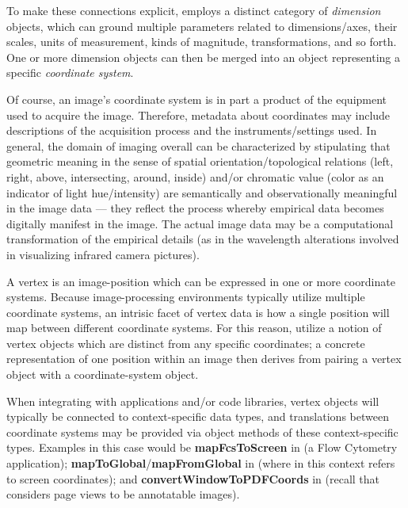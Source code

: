 {\begin{description}
To make these connections explicit, \AXFI{} 
employs a distinct category of \textit{dimension} 
objects, which can ground multiple parameters 
related to dimensions/axes, their scales, units 
of measurement, kinds of magnitude, transformations, 
and so forth.  One or more dimension objects 
can then be merged into an object representing 
a specific \textit{coordinate system}.

\label{ph:acquisition}Of course, an image's 
coordinate system is in part 
a product of the equipment used to acquire the 
image.  Therefore, metadata about coordinates 
may include descriptions of the 
acquisition process and the 
instruments/settings used.  In general, 
the domain of imaging overall can be 
characterized by stipulating that 
geometric meaning in the sense of spatial 
orientation/topological relations (left, right, above, 
intersecting, around, inside) and/or chromatic 
value (color as an indicator of light hue/intensity) 
are semantically and observationally meaningful 
in the image data --- they reflect the 
process whereby empirical data becomes digitally 
manifest in the image.  The actual image data 
may be a computational transformation of the 
empirical details (as in the wavelength alterations 
involved in visualizing infrared camera pictures).

\item[Vertices]  A vertex is an image-position which 
can be expressed in one or more coordinate systems.  
Because image-processing environments typically 
utilize multiple coordinate systems, an 
intrisic facet of vertex data is how 
a single position will map between different 
coordinate systems.  For this reason, \AXFI{} 
utilize a notion of vertex objects which are 
distinct from any specific coordinates; 
a concrete representation of one position 
within an image then derives from 
pairing a vertex object with a coordinate-system 
object.  

When integrating with applications and/or code 
libraries, \AXFI{} vertex objects will typically 
be connected to context-specific data types, 
and translations between coordinate systems 
may be provided via object methods of 
these context-specific types.  Examples 
in this case would be \textbf{mapFcsToScreen} in 
\FACSanadu{} (a Flow Cytometry application);  
\textbf{mapToGlobal}/\textbf{mapFromGlobal} 
in \Qt{} (where  in this context 
refers to screen coordinates); and 
\textbf{convertWindowToPDFCoords} in \XPDF{} 
(recall that \AXFI{} considers \PDF{} page 
views to be annotatable images).


\end{description}}
